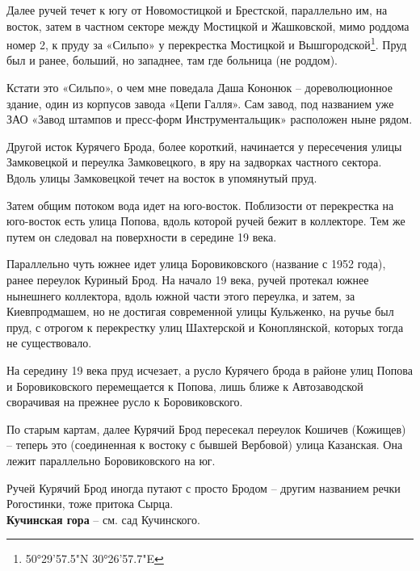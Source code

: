 Далее ручей течет к югу от Новомостицкой и Брестской, параллельно им, на восток, затем в частном секторе между Мостицкой и Жашковской, мимо роддома номер 2, к пруду за «Сильпо» у перекрестка Мостицкой и Вышгородской\footnote{50°29'57.5"N 30°26'57.7"E}. Пруд был и ранее, больший, но западнее, там где больница (не роддом).

Кстати это «Сильпо», о чем мне поведала Даша Кононюк – дореволюционное здание, один из корпусов завода «Цепи Галля». Сам завод, под названием уже ЗАО «Завод штампов и пресс-форм Инструментальщик» расположен ныне рядом.


Другой исток Курячего Брода, более короткий, начинается у пересечения улицы Замковецкой и переулка Замковецкого, в яру на задворках частного сектора. Вдоль улицы Замковецкой течет на восток в упомянутый пруд. 

Затем общим потоком вода идет на юго-вос\-ток. Поблизости от перекрестка на юго-восток есть улица Попова, вдоль которой ручей бежит в коллекторе. Тем же путем он следовал на поверхности в середине 19 века.

Параллельно чуть южнее идет улица Боровиковского (название с 1952 года), ранее переулок Куриный Брод. На начало 19 века, ручей протекал южнее нынешнего коллектора, вдоль южной части этого переулка, и затем, за Киевпродмашем, но не достигая современной улицы Кульженко, на ручье был пруд, с отрогом к перекрестку улиц Шахтерской и Коноплянской, которых тогда не существовало.

На середину 19 века пруд исчезает, а русло Курячего брода в районе улиц Попова и Боровиковского перемещается к Попова, лишь ближе к Автозаводской сворачивая на прежнее русло к Боровиковского.

По старым картам, далее Курячий Брод пересекал переулок Кошичев (Кожищев) – теперь это (соединенная к востоку с бывшей Вербовой) улица Казанская. Она лежит параллельно Боровиковского на юг.

Ручей Курячий Брод иногда путают с просто Бродом – другим названием речки Рогостинки, тоже притока Сырца.\\ 

\textbf{Кучинская гора} – см. сад Кучинского.
